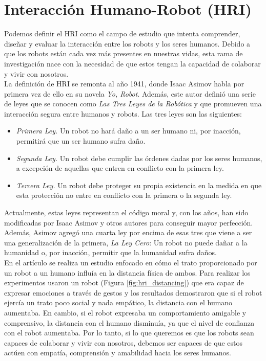 \section{Interacción Humano-Robot (HRI)}
\label{sec:interaccion_humano_robot}

Podemos definir el HRI como el campo de estudio que intenta comprender, diseñar y evaluar la interacción entre los robots y los seres humanos. Debido a que los robots están cada vez más presentes en nuestras vidas, esta rama de investigación nace con la necesidad de que estos tengan la capacidad de colaborar y vivir con nosotros.\\

La definición de HRI se remonta al año 1941, donde Isaac Asimov habla por primera vez de ello en su novela \textit{Yo, Robot}. Además, este autor definió una serie de leyes que se conocen como \textit{Las Tres Leyes de la Robótica} y que promueven una interacción segura entre humanos y robots. Las tres leyes son las siguientes:

\begin{itemize}
    \item \textit{Primera Ley.} Un robot no hará daño a un ser humano ni, por inacción, permitirá que un ser humano sufra daño.
    \item \textit{Segunda Ley.} Un robot debe cumplir las órdenes dadas por los seres humanos, a excepción de aquellas que entren en conflicto con la primera ley.
    \item \textit{Tercera Ley.} Un robot debe proteger su propia existencia en la medida en que esta protección no entre en conflicto con la primera o la segunda ley.
\end{itemize}

Actualmente, estas leyes representan el código moral y, con los años, han sido modificadas por Isaac Asimov y otros autores para conseguir mayor perfección. Además, Asimov agregó una cuarta ley por encima de esas tres que viene a ser una generalización de la primera, \textit{La Ley Cero}: Un robot no puede dañar a la humanidad o, por inacción, permitir que la humanidad sufra daños.\\

En el artículo \cite{hri_distancing} se realiza un estudio enfocado en cómo el trato proporcionado por un robot a un humano influía en la distancia física de ambos. Para realizar los experimentos usaron un robot (Figura \ref{fig:hri_distancing}) que era capaz de expresar emociones a través de gestos y los resultados demostraron que si el robot ejercía un trato poco social y nada empático, la distancia con el humano aumentaba. En cambio, si el robot expresaba un comportamiento amigable y comprensivo, la distancia con el humano disminuía, ya que el nivel de confianza con el robot aumentaba. Por lo tanto, si lo que queremos es que los robots sean capaces de colaborar y vivir con nosotros, debemos ser capaces de que estos actúen con empatía, comprensión y amabilidad hacia los seres humanos.\\

